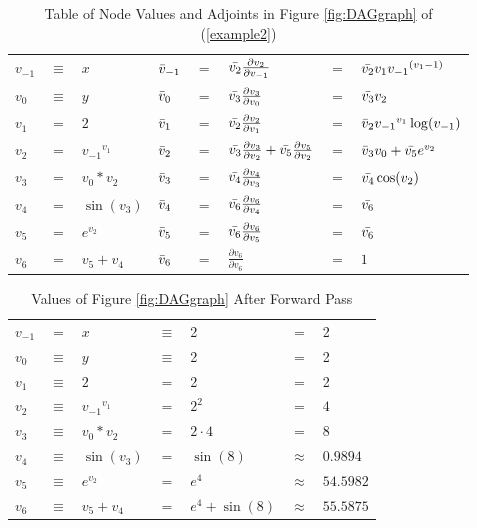 \documentclass{article}
\begin{document}
\begin{table}[h!]
    \centering
    \begin{tabular}{|lcl|lclll|}
        \hline
        $v_{-1}$ & $\equiv$ & $x$ & $\Bar{v}_{-1}$ & $=$ & $\Bar{v_2}\frac{\partial{v_2}}{\partial{v_{-1}}}$ & $=$ & $\Bar{v_2}v_1 {v_{-1}}^{(v_{1}-1)}$\\
        $v_{0}$ & $\equiv$ & $y$ & $\Bar{v}_{0}$ & $=$ & $\Bar{v_3}\frac{\partial{v_3}}{\partial{v_0}}$ & $=$ & $\Bar{v_3}v_2$\\
        \hline
        $v_{1}$ & $=$ & $2$ & $\Bar{v}_{1}$ & $=$ & $\Bar{v_2}\frac{\partial{v_2}}{\partial{v_1}}$ & $=$ & $\Bar{v}_{2}{v_{-1}}^{v_{1}}\log(v_{-1})$\\
        $v_{2}$ & $=$ & ${v_{-1}}^{v_{1}}$ & $\Bar{v}_{2}$ & $=$ & $\Bar{v_3}\frac{\partial{v_3}}{\partial{v_2}} + \Bar{v_5}\frac{\partial{v_5}}{\partial{v_2}}$ & $=$ & $\Bar{v}_{3}v_0 + \Bar{v_5}e^{v_2}$\\
        $v_{3}$ & $=$ & ${v_{0}}*{v_{2}}$ & $\Bar{v}_{3}$ & $=$ & $\Bar{v_4}\frac{\partial{v_4}}{\partial{v_3}}$ & $=$ & $\Bar{v_4}\cos(v_2)$\\
        $v_{4}$ & $=$ & $\sin(v_3)$ & $\Bar{v}_{4}$ & $=$ & $\Bar{v_6}\frac{\partial{v_6}}{\partial{v_4}}$ & $=$ & $\Bar{v_6}$\\
        $v_{5}$ & $=$ & $e^{v_2}$ & $\Bar{v}_{5}$ & $=$ & $\Bar{v_6}\frac{\partial{v_6}}{\partial{v_5}}$ & $=$ & $\Bar{v_6}$\\
        \hline
        $v_{6}$ & $=$ & $v_5 + v_4$ & $\Bar{v}_{6}$ & $=$ & $\frac{\partial{v_6}}{\partial{v_6}}$ & $=$ & $1$\\
        \hline
    \end{tabular}
    \caption{Table of Node Values and Adjoints in Figure \ref{fig:DAGgraph} of (\ref{example2})}
    \label{tab:example1}
\end{table}

\begin{table}[h!]
    \centering
    \begin{tabular}{|lclllcl|}
        \hline
        $v_{-1}$ & $=$ & $x$ & $\equiv$ & 2 & $=$ & 2\\
        $v_{0}$ & $\equiv$ & $y$ & $\equiv$ & 2 & $=$ & 2\\
        \hline
        $v_{1}$ & $\equiv$ & $2$ & $=$ & 2 & $=$ & 2\\
        $v_{2}$ & $\equiv$ & ${v_{-1}}^{v_{1}}$ & $=$ & $ 2^2$ & $=$ & $4$\\
        $v_{3}$ & $\equiv$ & $v_0 * v_2$ & $=$ & $ 2 \cdot 4$ & $=$ & $8$\\
        $v_{4}$ & $\equiv$ & $\sin(v_3)$ & $=$ & $\sin(8)$ & $\approx$ & $0.9894$\\
        $v_{5}$ & $\equiv$ & $e^{v_2}$ & $=$ & $ e^4$ & $\approx$ & $54.5982$\\
        \hline
        $v_{6}$ & $\equiv$ & $v_5 + v_4$ & $=$ & $e^4 + \sin(8)$ & $\approx$ & $55.5875$\\
        \hline
    \end{tabular}
    \caption{Values of Figure \ref{fig:DAGgraph} After Forward Pass}
    \label{tab:example1FP}
\end{table}
\end{document}
